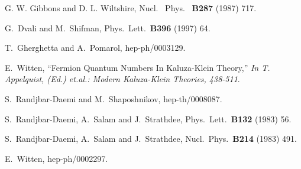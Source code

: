 \documentclass[a4paper,12pt]{article}
\begin{document}
\begin{thebibliography}{99}
G. W. Gibbons and D. L. Wiltshire, Nucl. \ Phys. \ {\bf B287} (1987)
717.

G.~Dvali and M.~Shifman,
Phys.\ Lett.\  {\bf B396} (1997) 64.

T.~Gherghetta and A.~Pomarol,
hep-ph/0003129.

E.~Witten, ``Fermion Quantum Numbers In Kaluza-Klein Theory,''
{\it  In T. Appelquist, (Ed.) et.al.: 
Modern Kaluza-Klein Theories, 438-511}. 

S.~Randjbar-Daemi and M.~Shaposhnikov,
hep-th/0008087.

S.~Randjbar-Daemi, A.~Salam and J.~Strathdee,
Phys.\ Lett.\  {\bf B132} (1983) 56.

S.~Randjbar-Daemi, A.~Salam and J.~Strathdee,
Nucl.\ Phys.\  {\bf B214} (1983) 491.

E.~Witten,
hep-ph/0002297.

\end{thebibliography}
\end{document}
